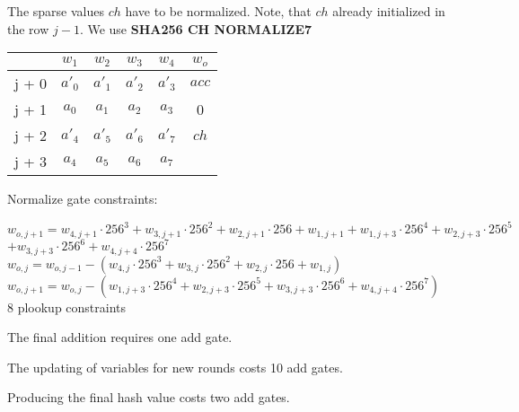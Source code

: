 The sparse values $ch$ have to be normalized.
Note, that $ch$ already initialized in the row $j - 1$.
We use \textbf{SHA256 CH NORMALIZE7}
\begin{center}
\begin{tabular}{ c|c|c|c|c|c } 
  & $w_1$ & $w_2$ & $w_3$ & $w_4$ & $w_o$\\ 
 \hline
j + 0 & $a'_0$ & $a'_1$ & $a'_2$ & $a'_3$ &  $acc$\\ 
j + 1 & $a_0$ & $ a_1$ & $a_2$ & $a_3$ & 0\\
j + 2 & $a'_4$ & $a'_5$ & $a'_6$ & $a'_7$ & $ch$ \\ 
j + 3 & $a_4$ & $ a_5$ & $a_6$ & $a_7$ &  \\
\end{tabular}
\end{center}

Normalize gate constraints:
\begin{center}
$w_{o,j+1} = w_{4,j+1} \cdot 256^3 + w_{3,j+1} \cdot 256^2 + w_{2,j+1} \cdot 256 + w_{1,j+1}
	+  w_{1,j+3} \cdot 256^4 + w_{2,j+3} \cdot 256^5$ \\
	$+ w_{3,j+3} \cdot 256^6 + w_{4,j+4} \cdot 256^7$ \\
$w_{o,j} = w_{o, j - 1} - (w_{4,j} \cdot 256^3 + w_{3,j} \cdot 256^2 + w_{2,j} \cdot 256 + w_{1,j})$ \\
$w_{o,j+1} = w_{o,j} - ( w_{1,j+3} \cdot 256^4 + w_{2,j+3} \cdot 256^5+ w_{3,j+3} \cdot 256^6 + w_{4,j+4} \cdot 256^7)$ \\
8 plookup constraints \\
\end{center}

The final addition requires one add gate.

The updating of variables for new rounds costs 10 add gates.

Producing the final hash value costs two add gates.
